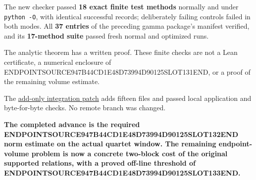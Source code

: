 The new checker passed \textbf{18 exact finite test methods} normally and under \texttt{python\ -O}, with identical successful records; deliberately failing controls failed in both modes. All \textbf{37 entries} of the preceding gamma package's manifest verified, and its \textbf{17-method suite} passed fresh normal and optimized runs.

The analytic theorem has a written proof. These finite checks are not a Lean certificate, a numerical enclosure of ENDPOINTSOURCE947B44CD1E48D73994D90125SLOT131END, or a proof of the remaining volume estimate.

The \href{sources/web_arithmetic_endpoint_delivery/Tau_Arithmetic_Endpoint_Bounds/INTEGRATION.patch}{add-only integration patch} adds fifteen files and passed local application and byte-for-byte checks. No remote branch was changed.

\textbf{The completed advance is the required ENDPOINTSOURCE947B44CD1E48D73994D90125SLOT132END norm estimate on the actual quartet window. The remaining endpoint-volume problem is now a concrete two-block cost of the original supported relations, with a proved off-line threshold of ENDPOINTSOURCE947B44CD1E48D73994D90125SLOT133END.}
